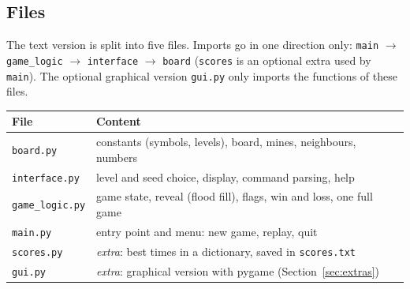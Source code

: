 \documentclass[11pt,a4paper]{article}
\newcommand{\code}[1]{\texttt{#1}}
\begin{document}
\subsection{Files}
The text version is split into five files. Imports go in one direction only:
\code{main} $\rightarrow$ \code{game\_logic} $\rightarrow$ \code{interface} $\rightarrow$ \code{board}
(\code{scores} is an optional extra used by \code{main}). The optional graphical version \code{gui.py}
only imports the functions of these files.

\begin{center}
\begin{tabularx}{\linewidth}{l X}
\toprule
\textbf{File} & \textbf{Content} \\
\midrule
\code{board.py} & constants (symbols, levels), board, mines, neighbours, numbers \\
\code{interface.py} & level and seed choice, display, command parsing, help \\
\code{game\_logic.py} & game state, reveal (flood fill), flags, win and loss, one full game \\
\code{main.py} & entry point and menu: new game, replay, quit \\
\code{scores.py} & \emph{extra}: best times in a dictionary, saved in \code{scores.txt} \\
\code{gui.py} & \emph{extra}: graphical version with pygame (Section~\ref{sec:extras}) \\
\bottomrule
\end{tabularx}
\end{center}
\end{document}
